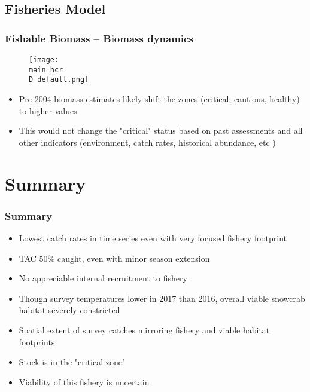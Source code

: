 \documentclass{beamer}
\numberwithin{equation}{section}		%
\numberwithin{figure}{section}	   	%
\numberwithin{table}{section}				%
\newcommand{\D}{.}  %
\newcommand{\main}{C:/bio.data/bio.snowcrab/assessments/2018/presentations/4X/}
\begin{document}
\subsection{Fisheries Model}
\begin{frame}
\frametitle{Fishable Biomass -- Biomass dynamics}

\begin{figure}
	\centering
	\texttt{[image: \\main hcr\\D default.png]}\\ 
\end{figure}
\begin{itemize}
	\item Pre-2004 biomass estimates likely shift the zones (critical, cautious, healthy) to higher values 
	\item This would not change the "critical" status based on past assessments and all other indicators (environment, catch rates, historical abundance, etc )
\end{itemize}
\end{frame}


\section{Summary}
\begin{frame}
\frametitle{Summary}
\begin{itemize}
\item Lowest catch rates in time series even with very focused fishery footprint
\item TAC 50\% caught, even with minor season extension
\item No appreciable internal recruitment to fishery
\item Though survey temperatures lower in 2017 than 2016, overall viable snowcrab habitat severely constricted
\item Spatial extent of survey catches mirroring fishery and viable habitat footprints 
\item Stock is in the "critical zone"
\item Viability of this fishery is uncertain

\end{itemize}
\end{frame}
\end{document}
